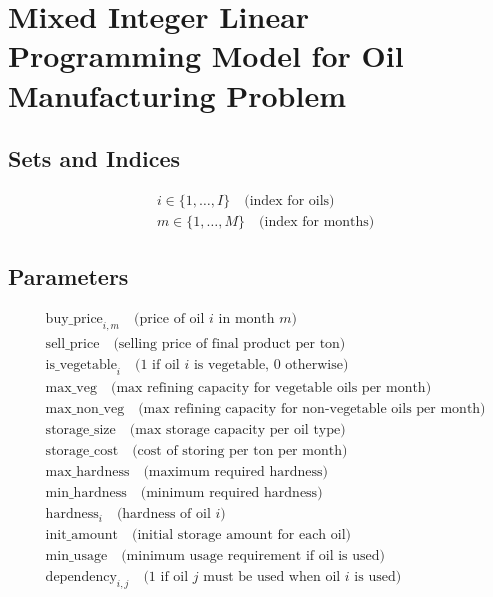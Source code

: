 \documentclass{article}
\begin{document}
\section*{Mixed Integer Linear Programming Model for Oil Manufacturing Problem}

\subsection*{Sets and Indices}
\begin{align*}
  & i \in \{1, \ldots, I\} \quad \text{(index for oils)} \\
  & m \in \{1, \ldots, M\} \quad \text{(index for months)}
\end{align*}

\subsection*{Parameters}
\begin{align*}
  & \text{buy\_price}_{i,m} \quad \text{(price of oil $i$ in month $m$)} \\
  & \text{sell\_price} \quad \text{(selling price of final product per ton)} \\
  & \text{is\_vegetable}_{i} \quad \text{(1 if oil $i$ is vegetable, 0 otherwise)} \\
  & \text{max\_veg} \quad \text{(max refining capacity for vegetable oils per month)} \\
  & \text{max\_non\_veg} \quad \text{(max refining capacity for non-vegetable oils per month)} \\
  & \text{storage\_size} \quad \text{(max storage capacity per oil type)} \\
  & \text{storage\_cost} \quad \text{(cost of storing per ton per month)} \\
  & \text{max\_hardness} \quad \text{(maximum required hardness)} \\
  & \text{min\_hardness} \quad \text{(minimum required hardness)} \\
  & \text{hardness}_{i} \quad \text{(hardness of oil $i$)} \\
  & \text{init\_amount} \quad \text{(initial storage amount for each oil)} \\
  & \text{min\_usage} \quad \text{(minimum usage requirement if oil is used)} \\
  & \text{dependency}_{i,j} \quad \text{(1 if oil $j$ must be used when oil $i$ is used)}
\end{align*}
\end{document}
